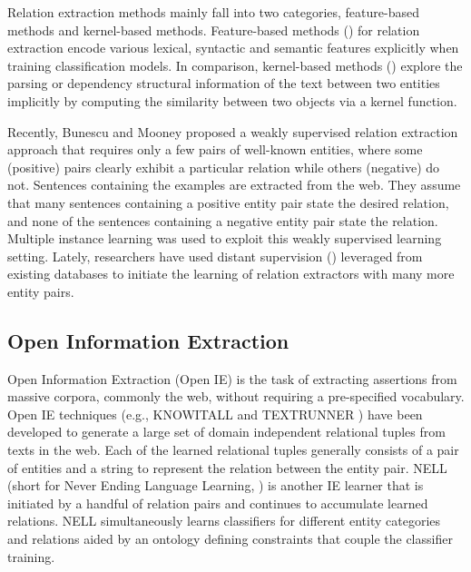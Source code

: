 Relation extraction methods mainly fall into 
two categories, feature-based methods and 
kernel-based methods. 
Feature-based methods (\cite{Nanda04,Zhou05})
for relation extraction encode various
lexical, syntactic and semantic features explicitly
when training classification models.
In comparison, kernel-based methods (\cite{zelenko03,Culotta04,Bunescu05,Zhang06a,Zhang06b,Zhou07})
explore the parsing or dependency structural information of 
the text between two entities implicitly 
by
computing the similarity between two objects via a kernel function.

Recently, Bunescu and Mooney \cite{bunescu07} 
proposed a weakly supervised relation extraction approach that 
requires only a few pairs of  
well-known entities, where some (positive) pairs 
clearly exhibit a particular relation while others (negative) do not. 
Sentences containing the examples are extracted from the web. 
They assume that many sentences containing 
a positive entity pair state the desired relation,  
and none of the sentences containing a negative entity pair state 
the relation.
Multiple instance learning was used to exploit this 
weakly supervised learning setting.
Lately, researchers have used distant supervision (\cite{Mintz09,Yao11,Hoffmann10})
leveraged from existing databases to initiate the learning of relation extractors 
with many more entity pairs. 




\subsection{Open Information Extraction}

Open Information Extraction (Open IE) is the task 
of extracting assertions from massive 
corpora, commonly the web, without requiring a pre-specified vocabulary. 
Open IE techniques (e.g., KNOWITALL \cite{etzioni05} and TEXTRUNNER \cite{banko07})
have been developed to generate a large set of domain independent relational tuples
from texts in the web. 
Each of the learned relational tuples generally consists of 
a pair of entities and a string to represent the relation between the entity pair. 
NELL (short for Never Ending Language Learning, \cite{carlson-sslnlp09,Carlson10}) is another IE 
learner that is initiated by a handful of relation pairs 
and 
continues to accumulate learned relations. 
NELL simultaneously learns classifiers 
for different entity categories and relations 
aided by an ontology defining
constraints that couple the classifier training. 

